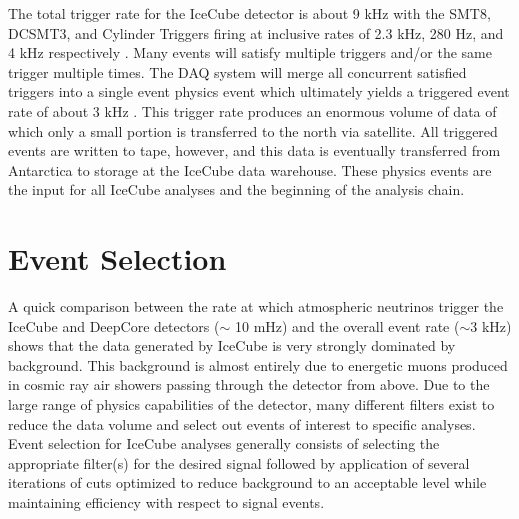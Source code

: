 \documentclass{gatech-thesis}
\begin{document}
The total trigger rate for the IceCube detector is about 9 kHz with the SMT8, DCSMT3, and Cylinder Triggers firing at inclusive rates of 2.3 kHz, 280 Hz, and 4 kHz respectively \cite{I3Live}. Many events will satisfy multiple triggers and/or the same trigger multiple times. The DAQ system will merge all concurrent satisfied triggers into a single event physics event which ultimately yields a triggered event rate of about 3 kHz \cite{I3Live}. This trigger rate produces an enormous volume of data of which only a small portion is transferred to the north via satellite. All triggered events are written to tape, however, and this data is eventually transferred from Antarctica to storage at the IceCube data warehouse. These physics events are the input for all IceCube analyses and the beginning of the analysis chain.

\chapter{Event Selection}
A quick comparison between the rate at which atmospheric neutrinos trigger the IceCube and DeepCore detectors ($\sim$ 10 mHz) and the overall event rate ($\sim 3$ kHz) shows that the data generated by IceCube is very strongly dominated by background. This background is almost entirely due to energetic muons produced in cosmic ray air showers passing through the detector from above. Due to the large range of physics capabilities of the detector, many different filters exist to reduce the data volume and select out events of interest to specific analyses. Event selection for IceCube analyses generally consists of selecting the appropriate filter(s) for the desired signal followed by application of several iterations of cuts optimized to reduce background to an acceptable level while maintaining efficiency with respect to signal events.
\end{document}
